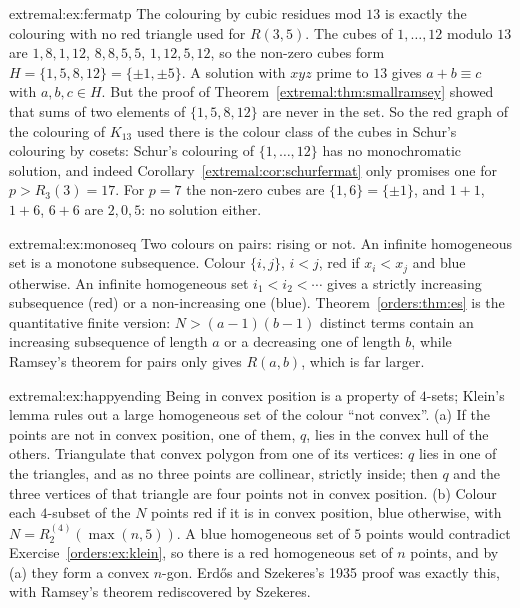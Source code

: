 \begin{solution}{extremal:ex:fermatp}
\idea The colouring by cubic residues mod $13$ is exactly the colouring with no red triangle used for $R(3,5)$.
\writeup The cubes of $1,\dots,12$ modulo $13$ are $1,8,1,12$, $8,8,5,5$, $1,12,5,12$, so the non-zero cubes form $H=\{1,5,8,12\}=\{\pm1,\pm5\}$. A solution with $xyz$ prime to $13$ gives $a+b\equiv c$ with $a,b,c\in H$. But
the proof of Theorem~\ref{extremal:thm:smallramsey} showed that sums of two elements of $\{1,5,8,12\}$ are never in the set. So the red graph of the colouring of $K_{13}$ used there is
the colour class of the cubes in Schur's colouring by cosets: Schur's colouring of $\{1,\dots,12\}$ has no monochromatic solution, and indeed Corollary~\ref{extremal:cor:schurfermat} only promises
one for $p>R_3(3)=17$. For $p=7$ the non-zero cubes are $\{1,6\}=\{\pm1\}$, and $1+1$, $1+6$, $6+6$ are $2,0,5$: no solution either.
\end{solution}

\begin{solution}{extremal:ex:monoseq}
\idea Two colours on pairs: rising or not. An infinite homogeneous set is a monotone subsequence.
\writeup Colour $\{i,j\}$, $i<j$, red if $x_i<x_j$ and blue otherwise. An infinite homogeneous set $i_1<i_2<\cdots$ gives a strictly increasing subsequence (red) or a non-increasing one (blue).
Theorem~\ref{orders:thm:es} is the quantitative finite version: $N>(a-1)(b-1)$ distinct terms contain an increasing subsequence of length $a$ or a decreasing one of length $b$, while Ramsey's theorem for pairs only gives
$R(a,b)$, which is far larger.
\end{solution}

\begin{solution}{extremal:ex:happyending}
\idea Being in convex position is a property of $4$-sets; Klein's lemma rules out a large homogeneous set of the colour ``not convex''.
\writeup (a) If the points are not in convex position, one of them, $q$, lies in the convex hull of the others. Triangulate that convex polygon from one of its vertices: $q$ lies in one of the triangles,
and as no three points are collinear, strictly inside; then $q$ and the three vertices of that triangle are four points not in convex position.
(b) Colour each $4$-subset of the $N$ points red if it is in convex position, blue otherwise, with $N=R^{(4)}_2(\max(n,5))$. A blue homogeneous set of $5$ points would contradict Exercise~\ref{orders:ex:klein}, so there is a red homogeneous set of $n$
points, and by (a) they form a convex $n$-gon. Erd\H os and Szekeres's 1935 proof was exactly this, with Ramsey's theorem rediscovered by Szekeres.
\end{solution}

